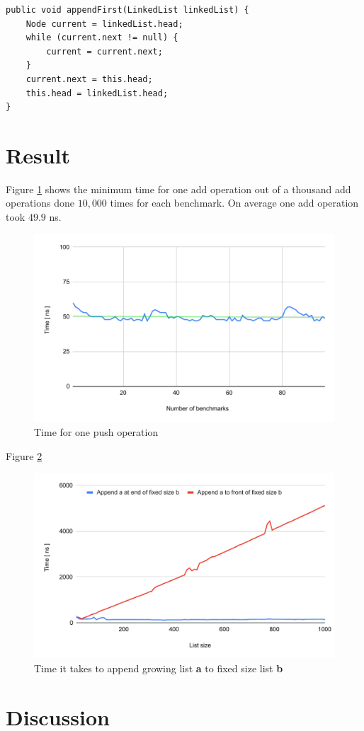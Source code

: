 \documentclass[a4paper,11pt]{article}
\newenvironment{code}{\captionsetup{type=listing}}{}
\begin{document}
\begin{code}
\label{code:append}
\begin{verbatim}
public void appendFirst(LinkedList linkedList) {
    Node current = linkedList.head;
    while (current.next != null) {
        current = current.next;
    }
    current.next = this.head;
    this.head = linkedList.head;
}
\end{verbatim}
\end{code}

\FloatBarrier
\section*{Result}
Figure \ref{fig:addOperation} shows the minimum time for one add operation out of a thousand add operations done $10,000$ 
times for each benchmark. On average one add operation took $49.9$ ns.

\begin{figure}[h]
    \centering
    \includegraphics[width=.8\textwidth]{addOperation.pdf}
    \caption{Time for one push operation}
    \label{fig:addOperation}
\end{figure}

Figure \ref{fig:listAppend}

\begin{figure}[h]
    \centering
    \includegraphics[width=.8\textwidth]{appendList.pdf}
    \caption{Time it takes to append growing list \textbf{a} to fixed size list \textbf{b}}
    \label{fig:listAppend}
\end{figure}

\section*{Discussion}
\end{document}
